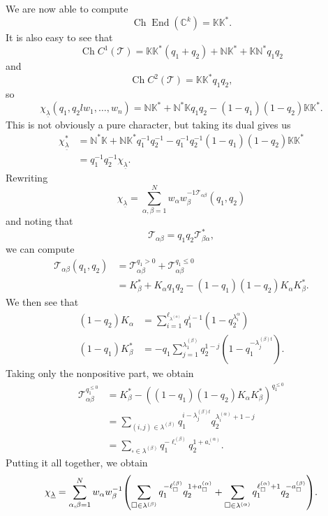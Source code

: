 \documentclass[leqno, openany]{memoir}
\theoremstyle{definition}
\theoremstyle{remark}
\theoremstyle{plain}
\theoremstyle{definition}
\theoremstyle{remark}
\newcommand{\N}{\mathbb{N}}
\newcommand{\C}{\mathbb{C}}
\newcommand{\K}{\mathbb{K}}
\newcommand{\mc}[1]{\mathcal{#1}}
\newcommand{\on}[1]{\operatorname{#1}}
\newcommand{\ul}[1]{\underline{#1}}
\DeclareMathOperator{\End}{End}
\begin{document}
We are now able to compute
\[ \on{Ch} \End(\C^k) = \mathbb{K} \mathbb{K}^*. \]
It is also easy to see that
\[ \on{Ch} C^1(\mc{T}) = \mathbb{K} \mathbb{K}^* (q_1 + q_2) + \N \mathbb{K}^* + \mathbb{K} \N^* q_1 q_2 \]
and
\[ \on{Ch} C^2(\mc{T}) = \mathbb{K} \mathbb{K}^* q_1 q_2, \]
so
\[ \chi_{\ul{\lambda}}(q_1, q_2l w_1, \ldots, w_n) = \N \mathbb{K}^* + \N^* \mathbb{K} q_1 q_2 - (1-q_1)(1-q_2) \mathbb{K} \K^*. \]
This is not obviously a pure character, but taking its dual gives us
\begin{align*}
    \chi_{\ul{\lambda}}^* &= \N^* \K + \N \K^* q_1^{-1} q_2^{-1} - q_1^{-1}q_2^{-1}(1-q_1)(1-q_2) \K \K^* \\
    &= q_1^{-1} q_2^{-1} \chi_{\ul{\lambda}}.
\end{align*}
Rewriting
\[ \chi_{\ul{\lambda}} = \sum_{\alpha,\beta=1}^N w_{\alpha}w_{\beta}^{-1 \mc{T}_{\alpha\beta}}(q_1, q_2) \]
and noting that
\[ \mc{T}_{\alpha\beta} = q_1q_2 \mc{T}_{\beta \alpha}^*, \]
we can compute
\begin{align*}
    \mc{T}_{\alpha\beta}(q_1, q_2) &= \mc{T}_{\alpha\beta}^{q_1>0} + \mc{T}_{\alpha\beta}^{q_1 \leq 0} \\
    &= K_{\beta}^* + K_{\alpha} q_1q_2 - (1-q_1)(1-q_2)K_{\alpha}K_{\beta}^*. 
\end{align*}
We then see that
\begin{align*}
    (1-q_2) K_{\alpha} &= \sum_{i=1}^{\ell_{\lambda^{(\alpha)}}} q_1^{i-1}(1-q_2^{\lambda_i^{\alpha}}) \\
    (1-q_1) K_{\beta}^* &= - q_1 \sum_{j=1}^{\lambda_1^{(\beta)}} q_2^{1-j} (1-q_1^{-\lambda_j^{(\beta) t}}).
\end{align*}
Taking only the nonpositive part, we obtain
\begin{align*}
    \mc{T}_{\alpha\beta}^{q_1^{\leq 0}} &= K_{\beta}^* - ((1-q_1)(1-q_2) K_{\alpha} K_{\beta}^*)^{q_1^{\leq 0}} \\
    &= \sum_{(i,j) \in \lambda^{(\beta)}} q_1^{i-\lambda_j^{(\beta) t}} q_2^{\lambda_i^{(\alpha)}+1-j} \\
    &= \sum_{\square \in \lambda^{(\beta)}} q_1^{-\ell_{\square}^{(\beta)}} q_2^{1+a_{\square}^{(\alpha)}}.
\end{align*}
Putting it all together, we obtain
\[ \chi_{\ul{\lambda}} = \sum_{\alpha,\beta=1}^N w_{\alpha}w_{\beta}^{-1} \qty(\sum_{\square \in \lambda^{(\beta)}} q_1^{-\ell_{\square}^{(\beta)}} q_2^{1+a_{\square}^{(\alpha)}} + \sum_{\square \in \lambda^{(\alpha)}} q_1^{\ell_{\square}^{( \alpha )}+1} q_2^{-a_{\square}^{(\beta)}}). \]
\end{document}
